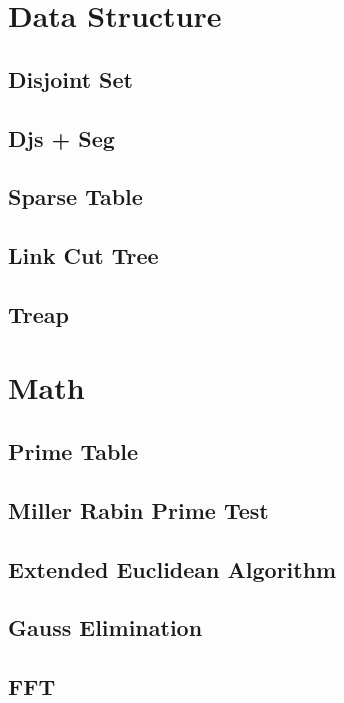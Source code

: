 \documentclass[10pt,twocolumn,oneside]{article}
\begin{document}
\section{Data Structure}
\subsection{Disjoint Set}

\subsection{Djs + Seg}

\subsection{Sparse Table}

\subsection{Link Cut Tree}

\subsection{Treap}


\section{Math}
\subsection{Prime Table}

\subsection{Miller Rabin Prime Test}

\subsection{Extended Euclidean Algorithm}

\subsection{Gauss Elimination}

\subsection{FFT}


\end{document}
